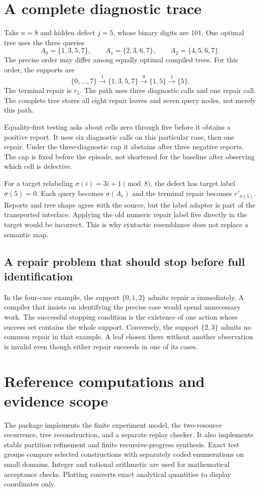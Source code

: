 \documentclass[11pt,letterpaper]{article}
\theoremstyle{plain}
\theoremstyle{definition}
\begin{document}
\appendix
\section{A complete diagnostic trace}\label{app:trace}
Take $n=8$ and hidden defect $j=5$, whose binary digits are $101$. One optimal tree uses the three queries
\[
A_0=\{1,3,5,7\},\qquad A_1=\{2,3,6,7\},\qquad A_2=\{4,5,6,7\}.
\]
The precise order may differ among equally optimal compiled trees. For this order, the supports are
\[
\{0,\ldots,7\}\xrightarrow{1}\{1,3,5,7\}
\xrightarrow{0}\{1,5\}\xrightarrow{1}\{5\}.
\]
The terminal repair is $r_5$. The path uses three diagnostic calls and one repair call. The complete tree stores all eight repair leaves and seven query nodes, not merely this path.

Equality-first testing asks about cells zero through five before it obtains a positive report. It uses six diagnostic calls on this particular case, then one repair. Under the three-diagnostic cap it abstains after three negative reports. The cap is fixed before the episode, not shortened for the baseline after observing which cell is defective.

For a target relabeling $\sigma(i)=3i+1\pmod8$, the defect has target label $\sigma(5)=0$. Each query becomes $\sigma(A_r)$ and the terminal repair becomes $r'_{\sigma(5)}$. Reports and tree shape agree with the source, but the label adapter is part of the transported interface. Applying the old numeric repair label five directly in the target would be incorrect. This is why syntactic resemblance does not replace a semantic map.

\subsection{A repair problem that should stop before full identification}
In the four-case example, the support $\{0,1,2\}$ admits repair $a$ immediately. A compiler that insists on identifying the precise case would spend unnecessary work. The successful stopping condition is the existence of one action whose success set contains the whole support. Conversely, the support $\{2,3\}$ admits no common repair in that example. A leaf chosen there without another observation is invalid even though either repair succeeds in one of its cases.

\section{Reference computations and evidence scope}\label{app:checks}
The package implements the finite experiment model, the two-resource recurrence, tree reconstruction, and a separate replay checker. It also implements stable partition refinement and finite recursive-progress synthesis. Exact test groups compare selected constructions with separately coded enumerations on small domains. Integer and rational arithmetic are used for mathematical acceptance checks. Plotting converts exact analytical quantities to display coordinates only.
\end{document}
